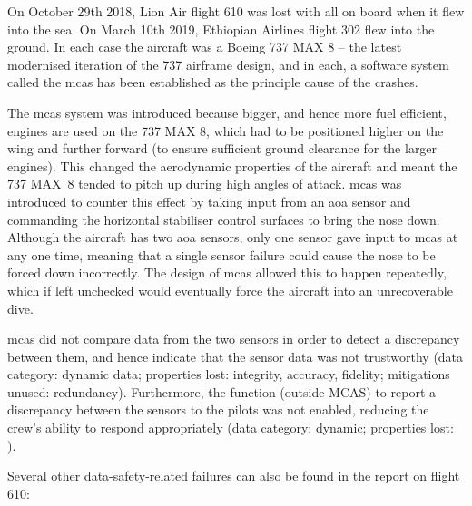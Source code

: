 On October 29th 2018, Lion Air flight 610 was lost with all on board when it flew into the sea. On March 10th 2019, Ethiopian Airlines flight 302 flew into the ground. In each case the aircraft was a Boeing 737 MAX 8 -- the latest modernised iteration of the 737 airframe design, and in each, a software system called the \gls{mcas} has been established as the principle cause of the crashes.

The \gls{mcas} system was introduced because bigger, and hence more fuel efficient, engines are used on the 737 MAX 8, which had to be positioned higher on the wing and further forward (to ensure sufficient ground clearance for the larger engines). This changed the aerodynamic properties of the aircraft and meant the 737 MAX~8 tended to pitch up during high angles of attack. \Gls{mcas} was introduced to counter this effect by taking input from an \gls{aoa} sensor and commanding the horizontal stabiliser control surfaces to bring the nose down. Although the aircraft has two \gls{aoa} sensors, only one sensor gave input to \gls{mcas} at any one time, meaning that a single sensor failure could cause the nose to be forced down incorrectly. The design of \gls{mcas} allowed this to happen repeatedly, which if left unchecked would eventually force the aircraft into an unrecoverable dive.

\Gls{mcas} did not compare data from the two sensors in order to detect a discrepancy between them, and hence indicate that the sensor data was not trustworthy (data category: {dynamic data}; properties lost: \gls{integrity}, \gls{accuracy}, \gls{fidelity}; \glspl{mitigation} unused: redundancy). Furthermore, the function (outside MCAS) to report a discrepancy between the sensors to the pilots was not enabled, reducing the crew's ability to respond appropriately (data category: dynamic; properties lost: ).

Several other data-safety-related failures can also be found in the report on flight 610:


